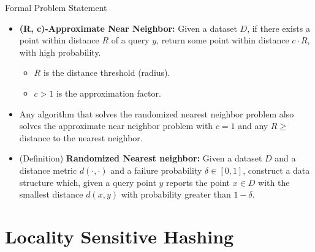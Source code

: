 \documentclass[Serif, 10pt, brown]{beamer}
\theoremstyle{example}
\theoremstyle{plain}
\begin{document}
\begin{frame}{Formal Problem Statement}
	\begin{itemize}
		\item \textbf{(R, c)-Approximate Near Neighbor:} Given a dataset $D$, if there exists a point within distance $R$ of a query $y$, return some point within distance $c \cdot R$, with high probability.
		\begin{itemize}
			\item $R$ is the distance threshold (radius).
			\item $c > 1$ is the approximation factor.
		\end{itemize}
		\item Any algorithm that solves the randomized nearest neighbor problem also solves the approximate near neighbor problem with $c=1$ and any $R \ge$ distance to the nearest neighbor.
		\item {(Definition)}
		{\bf Randomized Nearest neighbor:} Given a dataset $D$ and a distance metric $d(\cdot, \cdot)$ and a failure probability $\delta \in [0, 1]$, construct a data structure which, given a query point $y$ reports the point $x \in D$ with the smallest distance $d(x,y)$ with probability greater than $1 - \delta$.
	\end{itemize}
\end{frame}

\section{Locality Sensitive Hashing}
\end{document}
